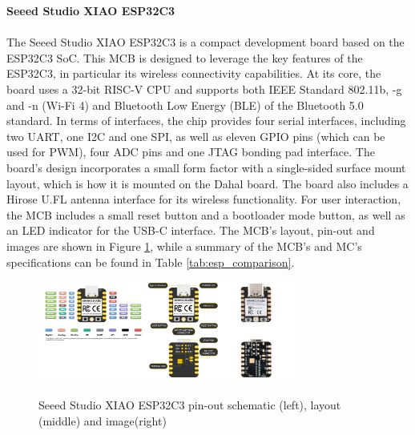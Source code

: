 \textbf{Seeed Studio XIAO ESP32C3}\\\\
The Seeed Studio XIAO ESP32C3 is a compact development board based on the ESP32C3 SoC. This MCB is designed to leverage the key features of the ESP32C3, in particular its wireless connectivity capabilities. At its core, the board uses a 32-bit RISC-V CPU and supports both IEEE Standard 802.11b, -g and -n (Wi-Fi 4) and Bluetooth Low Energy (BLE) of the Bluetooth 5.0 standard.
In terms of interfaces, the chip provides four serial interfaces, including two UART, one I2C and one SPI, as well as eleven GPIO pins (which can be used for PWM), four ADC pins and one JTAG bonding pad interface.
The board's design incorporates a small form factor with a single-sided surface mount layout, which is how it is mounted on the Dahal board. The board also includes a Hirose U.FL antenna interface for its wireless functionality. For user interaction, the MCB includes a small reset button and a bootloader mode button, as well as an LED indicator for the USB-C interface. The MCB's layout, pin-out and images are shown in Figure \ref{fig:esp32c3}, while a summary of the MCB's and MC's specifications can be found in Table \ref{tab:esp_comparison}. \citep{espressif_systems_esp32-c3_2024, seeed_studio_seeed_2024-2}

\begin{figure}[H]
    \centering
    \includegraphics[width=0.75\textwidth]{overleaf/images/xiaoesp32c3.png}
    \\\vspace{\ftspace}
    \caption{Seeed Studio XIAO ESP32C3 pin-out schematic (left), layout (middle) and image(right) \citep[adapted from][]{seeed_studio_seeed_2024-2}}
    \label{fig:esp32c3}
\end{figure}


